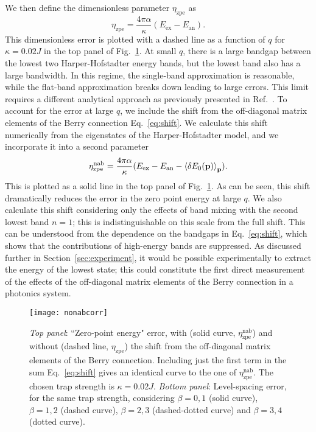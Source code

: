 We then define the dimensionless parameter $\eta_{\text{zpe}}$ as
\begin{equation} \eta_{\text{zpe}} = \frac{4\pi\alpha}{\kappa}
(E_{\text{ex}} -E_{\text{an}}).
\end{equation} This dimensionless error is plotted with a dashed line
as a function of $q$ for $\kappa=0.02 J$ in the top panel of
Fig.~\ref{fig:zpe}. At small $q$, there is a large bandgap between the
lowest two Harper-Hofstadter energy bands, but the lowest band also
has a large bandwidth. In this regime, the single-band approximation
is reasonable, while the flat-band approximation breaks down leading
to large errors. This limit requires a different analytical approach
as previously presented in Ref.~\cite{ozawa2014momhh}.  To account for
the error at large $q$, we include the shift from the off-diagonal
matrix elements of the Berry connection Eq.~\eqref{eq:shift}. We
calculate this shift numerically from the eigenstates of the
Harper-Hofstadter model, and we incorporate it into a second parameter
\begin{equation} \eta_{\text{zpe}}^{\text{nab}} =
\frac{4\pi\alpha}{\kappa}(E_{\text{ex}} - E_{\text{an}} - \left<\delta
E_0(\mathbf{p})\right>_{\mathbf{p}}).
\end{equation} This is plotted as a solid line in the top panel of
Fig.~\ref{fig:zpe}. As can be seen, this shift dramatically reduces
the error in the zero point energy at large $q$. We also calculate
this shift considering only the effects of band mixing with the second
lowest band $n=1$; this is indistinguishable on this scale from the
full shift. This can be understood from the dependence on the bandgaps
in Eq.~\eqref{eq:shift}, which shows that the contributions of
high-energy bands are suppressed. As discussed further in
Section~\ref{sec:experiment}, it would be possible experimentally to extract
the energy of the lowest state; this could constitute the first direct
measurement of the effects of the off-diagonal matrix elements of the
Berry connection in a photonics system.

\begin{figure}[tb]\centering
  \texttt{[image: nonabcorr]}
  \caption{\emph{Top panel}: ``Zero-point energy" error, with (solid
curve, $\eta_{\text{zpe}}^{\text{nab}}$) and without (dashed line,
$\eta_{\text{zpe}}$) the shift from the off-diagonal matrix elements
of the Berry connection. Including just the first term in the sum
Eq.~\eqref{eq:shift} gives an identical curve to the one of
$\eta_{\text{zpe}}^{\text{nab}}$. The chosen trap strength is $\kappa
= 0.02 J$.  \emph{Bottom panel}: Level-spacing error, for the same
trap strength, considering $\beta = 0,1$ (solid curve), $\beta = 1,2$
(dashed curve), $\beta = 2,3$ (dashed-dotted curve) and $\beta = 3,4$
(dotted curve).}
  \label{fig:zpe}
\end{figure}

